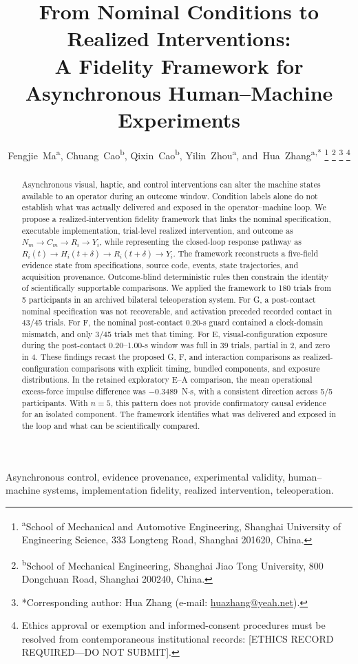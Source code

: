 \documentclass[journal]{IEEEtran}
\title{From Nominal Conditions to Realized Interventions:\\
A Fidelity Framework for Asynchronous Human--Machine Experiments}
\author{Fengjie~Ma\textsuperscript{a},
Chuang~Cao\textsuperscript{b},
Qixin~Cao\textsuperscript{b},
Yilin~Zhou\textsuperscript{a},
and~Hua~Zhang\textsuperscript{a,*}%
\thanks{\textsuperscript{a}School of Mechanical and Automotive Engineering,
Shanghai University of Engineering Science, 333 Longteng Road, Shanghai
201620, China.}%
\thanks{\textsuperscript{b}School of Mechanical Engineering, Shanghai Jiao
Tong University, 800 Dongchuan Road, Shanghai 200240, China.}%
\thanks{*Corresponding author: Hua Zhang
(e-mail: \href{mailto:huazhang@yeah.net}{huazhang@yeah.net}).}%
\thanks{Ethics approval or exemption and informed-consent procedures must be
resolved from contemporaneous institutional records:
[ETHICS RECORD REQUIRED---DO NOT SUBMIT].}}
\begin{document}
\maketitle

\begin{abstract}
Asynchronous visual, haptic, and control interventions can alter the machine
states available to an operator during an outcome window. Condition labels
alone do not establish what was actually delivered and exposed in
the operator--machine loop. We propose a realized-intervention fidelity
framework that links the nominal specification, executable implementation,
trial-level realized intervention, and outcome as
$N_m\rightarrow C_m\rightarrow R_i\rightarrow Y_i$, while representing the
closed-loop response pathway as
$R_i(t)\rightarrow H_i(t+\delta)\rightarrow R_i(t+\delta)\rightarrow Y_i$.
The framework reconstructs a five-field evidence state from specifications,
source code, events, state trajectories, and
acquisition provenance. Outcome-blind deterministic rules then constrain the
identity of scientifically supportable comparisons. We applied the framework
to 180 trials from 5 participants in an archived bilateral teleoperation
system. For G, a post-contact nominal specification was not recoverable, and
activation preceded recorded contact in 43/45 trials. For F, the nominal
post-contact 0.20-s guard contained a clock-domain mismatch, and only 3/45
trials met that timing. For E, visual-configuration exposure during the
post-contact 0.20--1.00-s window was full in 39 trials, partial in 2, and zero
in 4. These findings recast the proposed G, F, and interaction comparisons as
realized-configuration comparisons with explicit timing, bundled components,
and exposure distributions. In the retained exploratory E--A comparison, the
mean operational excess-force impulse difference was $-0.3489$~N$\cdot$s,
with a consistent direction across 5/5 participants. With $n=5$, this pattern
does not provide confirmatory causal evidence for an isolated component. The
framework identifies what was delivered and exposed in the loop and what can
be scientifically compared.
\end{abstract}

\begin{IEEEkeywords}
Asynchronous control, evidence provenance, experimental validity,
human--machine systems, implementation fidelity, realized intervention,
teleoperation.
\end{IEEEkeywords}

\end{document}

